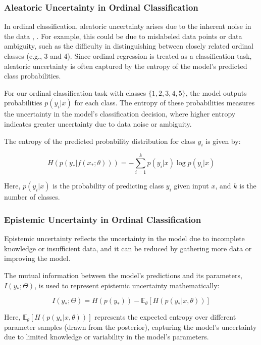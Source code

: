 \documentclass{report}
\begin{document}
\subsubsection{Aleatoric Uncertainty in Ordinal Classification}

In ordinal classification, aleatoric uncertainty arises due to the inherent noise in the data \cite{combalia2020uncertainty}, \cite{carneiro2020deep}. For example, this could be due to mislabeled data points or data ambiguity, such as the difficulty in distinguishing between closely related ordinal classes (e.g., 3 and 4). Since ordinal regression is treated as a classification task, aleatoric uncertainty is often captured by the entropy of the model’s predicted class probabilities.

For our ordinal classification task with classes \( \{1, 2, 3, 4, 5\} \), the model outputs probabilities \( p(y_i | x) \) for each class. The entropy of these probabilities measures the uncertainty in the model’s classification decision, where higher entropy indicates greater uncertainty due to data noise or ambiguity.

The entropy of the predicted probability distribution for class \( y_i \) is given by:

\[
H(p(y_* | f(x_*; \theta))) = - \sum_{i=1}^{k} p(y_i | x) \log p(y_i | x)
\]

Here, \( p(y_i | x) \) is the probability of predicting class \( y_i \) given input \( x \), and \( k \) is the number of classes. 

\subsubsection{Epistemic Uncertainty in Ordinal Classification}

Epistemic uncertainty reflects the uncertainty in the model due to incomplete knowledge or insufficient data, and it can be reduced by gathering more data or improving the model. 

The mutual information between the model’s predictions and its parameters, \( I(y_*; \Theta) \), is used to represent epistemic uncertainty mathematically\cite{depeweg2018decomposition}:

\[
I(y_*; \Theta) = H(p(y_*)) - \mathbb{E}_{\theta}[H(p(y_* | x, \theta))]
\]

Here, \( \mathbb{E}_{\theta}[H(p(y_* | x, \theta))] \) represents the expected entropy over different parameter samples (drawn from the posterior), capturing the model's uncertainty due to limited knowledge or variability in the model's parameters.
\end{document}

